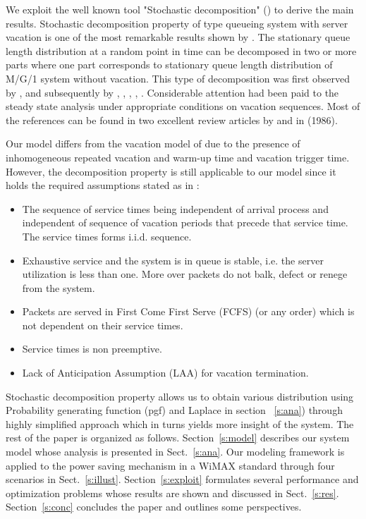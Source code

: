 \documentclass[journal]{IEEEtran}
\begin{document}
We exploit the well known tool "Stochastic decomposition" (\cite{Fuhrmann_Copper_1985}) to derive the main results.
Stochastic decomposition property of  type queueing system with server vacation is one of the most remarkable results shown by \cite{Fuhrmann_Copper_1985}. The stationary queue length distribution at a random point in time can be decomposed in two or more parts where one part corresponds to stationary queue length distribution of M/G/1 system without vacation. This type of decomposition was first observed by \cite{Gaver_1962}, and subsequently by \cite{Miller_1964, Cooper_1970}, \cite{Levy_1975}, \cite{Shanthikumar_1980}, \cite{Scholl_Kleinrock_1983}, \cite{Ali_Neuts_1984}.
Considerable attention had been paid to the steady state analysis
under appropriate conditions on vacation sequences. Most of the
references can be found in two excellent review articles by
\cite{Doshi} and \cite{Teghem} in (1986).

Our model differs from the vacation model of \cite{Fuhrmann_Copper_1985}
due to the presence of inhomogeneous repeated vacation and warm-up time and vacation trigger time.
However, the decomposition property is still applicable to our
model since it holds the required assumptions stated
as in \cite{Shanthikumar}:
\begin{itemize}
\item The sequence of service times being independent of
arrival process and independent of sequence of vacation
periods that precede that service time. The service times
forms i.i.d. sequence.
\item Exhaustive service and the system is in queue is
stable, i.e. the server utilization is less than one.
More over packets do not balk, defect or renege from
the system.
\item Packets are served in First Come First Serve (FCFS) (or any order) which is
not dependent on their service times.
\item Service times is non preemptive.
\item Lack of Anticipation Assumption (LAA) for vacation termination.
\end{itemize}
Stochastic decomposition property allows us to obtain various
distribution using Probability generating function (pgf) and Laplace in section ~\ref{s:ana}) through highly
simplified approach which in turns yields more insight of the system.
The rest of the paper is organized as follows. Section~\ref{s:model}
describes our system model whose analysis is presented in
Sect.~\ref{s:ana}. Our modeling framework is applied to the power
saving mechanism in a WiMAX standard through four scenarios in
Sect.~\ref{s:illust}. Section~\ref{s:exploit} formulates several
performance and optimization problems whose results are shown and
discussed in Sect.~\ref{s:res}. Section~\ref{s:conc} concludes the
paper and outlines some perspectives.
\end{document}
